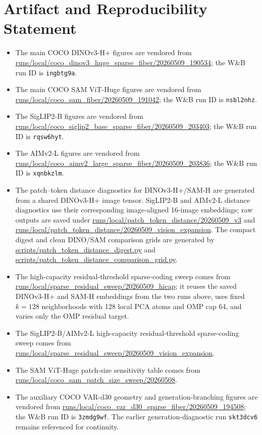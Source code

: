 \documentclass{article}
\newcommand{\dataset}[1]{\textsc{#1}}
\begin{document}
\clearpage

\section{Artifact and Reproducibility Statement}
\begin{itemize}[leftmargin=1.5em]
\item The main \dataset{COCO} DINOv3-H+ figures are vendored from \url{runs/local/coco_dinov3_huge_sparse_fiber/20260509_190534}; the W\&B run ID is \texttt{ingbtg9a}.
\item The main \dataset{COCO} SAM ViT-Huge figures are vendored from \url{runs/local/coco_sam_fiber/20260509_191042}; the W\&B run ID is \texttt{nsbl2nhz}.
\item The SigLIP2-B figures are vendored from \url{runs/local/coco_siglip2_base_sparse_fiber/20260509_203403}; the W\&B run ID is \texttt{rqsw6hyt}.
\item The AIMv2-L figures are vendored from \url{runs/local/coco_aimv2_large_sparse_fiber/20260509_203836}; the W\&B run ID is \texttt{xqnbkzlm}.
\item The patch--token distance diagnostics for DINOv3-H+/SAM-H are generated from a shared DINOv3-H+ image tensor. SigLIP2-B and AIMv2-L distance diagnostics use their corresponding image-aligned 16-image embeddings; raw outputs are saved under \url{runs/local/patch_token_distance/20260509_v3} and \url{runs/local/patch_token_distance/20260509_vision_expansion}. The compact digest and clean DINO/SAM comparison grids are generated by \url{scripts/patch_token_distance_digest.py} and \url{scripts/patch_token_distance_comparison_grid.py}.
\item The high-capacity residual-threshold sparse-coding sweep comes from \url{runs/local/sparse_residual_sweep/20260509_hicap}; it reuses the saved DINOv3-H+ and SAM-H embeddings from the two runs above, uses fixed $k=128$ neighborhoods with 128 local PCA atoms and OMP cap 64, and varies only the OMP residual target.
\item The SigLIP2-B/AIMv2-L high-capacity residual-threshold sparse-coding sweep comes from \url{runs/local/sparse_residual_sweep/20260509_vision_expansion}.
\item The SAM ViT-Huge patch-size sensitivity table comes from \url{runs/local/coco_sam_patch_size_sweep/20260508}.
\item The auxiliary \dataset{COCO} VAR-d30 geometry and generation-branching figures are vendored from \url{runs/local/coco_var_d30_sparse_fiber/20260509_194508}; the W\&B run ID is \texttt{3zmdg9wf}. The earlier generation-diagnostic run \texttt{skt3dcv6} remains referenced for continuity.

\end{itemize}
\end{document}
